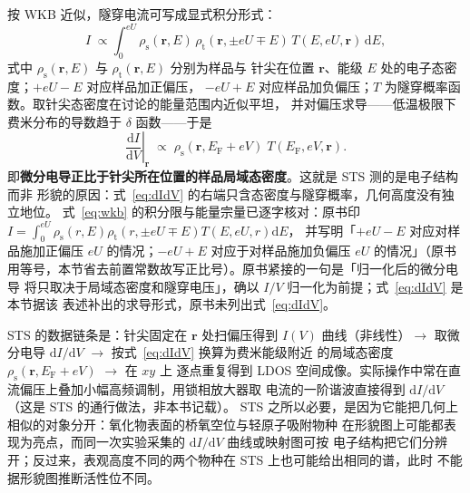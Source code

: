 \begin{principle}
按 WKB 近似，隧穿电流可写成显式积分形式：
\begin{equation}
I\;\propto\!\int_{0}^{eU}\!
\rho_{\mathrm{s}}(\mathbf{r},E)\,
\rho_{\mathrm{t}}(\mathbf{r},\pm eU\mp E)\,
T(E,eU,\mathbf{r})\,\mathrm{d}E ,
\label{eq:wkb}
\end{equation}
式中 $\rho_{\mathrm{s}}(\mathbf{r},E)$ 与 $\rho_{\mathrm{t}}(\mathbf{r},E)$ 分别为样品与
针尖在位置 $\mathbf{r}$、能级 $E$ 处的电子态密度；$+eU-E$ 对应样品加正偏压，
$-eU+E$ 对应样品加负偏压；$T$ 为隧穿概率函数。取针尖态密度在讨论的能量范围内近似平坦，
并对偏压求导——低温极限下费米分布的导数趋于 $\delta$ 函数——于是
\begin{equation}
\left.\frac{\mathrm{d}I}{\mathrm{d}V}\right|_{\mathbf{r}}
\;\propto\;\rho_{\mathrm{s}}(\mathbf{r},E_{\mathrm{F}}+eV)\;
T(E_{\mathrm{F}},eV,\mathbf{r}).
\label{eq:dIdV}
\end{equation}
即\textbf{微分电导正比于针尖所在位置的样品局域态密度}。这就是 STS 测的是电子结构而非
形貌的原因：式~\eqref{eq:dIdV} 的右端只含态密度与隧穿概率，几何高度没有独立地位。
式~\eqref{eq:wkb} 的积分限与能量宗量已逐字核对：原书印
$I=\int_{0}^{eU}\rho_{\mathrm{s}}(r,E)\rho_{\mathrm{t}}(r,\pm eU\mp E)T(E,eU,r)\mathrm{d}E$，
并写明「$+eU-E$ 对应对样品施加正偏压 $eU$ 的情况；$-eU+E$ 对应于对样品施加负偏压 $eU$
的情况」（原书用等号，本节省去前置常数故写正比号）。原书紧接的一句是「归一化后的微分电导
将只取决于局域态密度和隧穿电压」，确以 $I/V$ 归一化为前提；式~\eqref{eq:dIdV} 是本节据该
表述补出的求导形式，原书未列出式~\eqref{eq:dIdV}。
\end{principle}

\begin{dataflow}
STS 的数据链条是：针尖固定在 $\mathbf{r}$ 处扫偏压得到 $I(V)$ 曲线（非线性）$\rightarrow$
取微分电导 $\mathrm{d}I/\mathrm{d}V$ $\rightarrow$ 按式~\eqref{eq:dIdV} 换算为费米能级附近
的局域态密度 $\rho_{\mathrm{s}}(\mathbf{r},E_{\mathrm{F}}+eV)$ $\rightarrow$ 在 $xy$ 上
逐点重复得到 LDOS 空间成像。实际操作中常在直流偏压上叠加小幅高频调制，用锁相放大器取
电流的一阶谐波直接得到 $\mathrm{d}I/\mathrm{d}V$（这是 STS 的通行做法，非本书记载）。
STS 之所以必要，是因为它能把几何上相似的对象分开：氧化物表面的桥氧空位与轻原子吸附物种
在形貌图上可能都表现为亮点，而同一次实验采集的 $\mathrm{d}I/\mathrm{d}V$ 曲线或映射图可按
电子结构把它们分辨开；反过来，表观高度不同的两个物种在 STS 上也可能给出相同的谱，此时
不能据形貌图推断活性位不同。
\end{dataflow}

